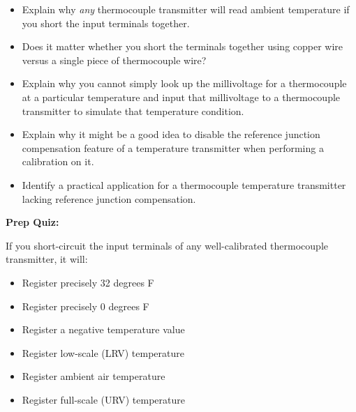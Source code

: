 \begin{itemize}
\item{} Explain why {\it any} thermocouple transmitter will read ambient temperature if you short the input terminals together.
\item{} Does it matter whether you short the terminals together using copper wire versus a single piece of thermocouple wire?
\item{} Explain why you cannot simply look up the millivoltage for a thermocouple at a particular temperature and input that millivoltage to a thermocouple transmitter to simulate that temperature condition.
\item{} Explain why it might be a good idea to disable the reference junction compensation feature of a temperature transmitter when performing a calibration on it.
\item{} Identify a practical application for a thermocouple temperature transmitter lacking reference junction compensation.
\end{itemize}



\vfil \eject

\noindent
{\bf Prep Quiz:}

If you short-circuit the input terminals of any well-calibrated thermocouple transmitter, it will:

\begin{itemize}
\item{} Register precisely 32 degrees F
\vskip 5pt 
\item{} Register precisely 0 degrees F
\vskip 5pt 
\item{} Register a negative temperature value
\vskip 5pt 
\item{} Register low-scale (LRV) temperature
\vskip 5pt 
\item{} Register ambient air temperature
\vskip 5pt 
\item{} Register full-scale (URV) temperature
\end{itemize}







